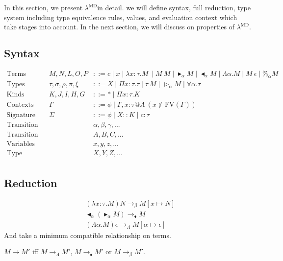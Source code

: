 \documentclass[runningheads]{llncs}
\newcommand{\LMD}{$\lambda^{\textrm{MD}}$}
\newcommand{\G}{\Gamma}
\newcommand{\TW}{\triangleright}
\newcommand{\F}{\forall}
\newcommand{\TB}{\blacktriangleright}
\newcommand{\TBL}{\blacktriangleleft}
\begin{document}
In this section, we present \LMD in detail. we will define syntax, full reduction, type system including type equivalence rules, values, and evaluation context which take stages into account.
In the next section, we will discuss on properties of \LMD.

\subsection{Syntax}

\begin{align*}
    \textrm{Terms} && M,N,L,O,P & ::= c \mid x \mid \lambda x:\tau.M\ \mid M\ M \mid \TB_\alpha M 
    \mid \TBL_\alpha M \mid \Lambda\alpha.M \mid M\ \epsilon \mid \%_\alpha M\\ 
    \textrm{Types} && \tau,\sigma,\rho,\pi,\xi & ::= X \mid \Pi x:\tau.\tau \mid \tau\ M \mid \TW_{\alpha} M \mid \F\alpha.\tau \\
    \textrm{Kinds} && K,J,I,H,G & ::= * \mid \Pi x:\tau.K\\
    \textrm{Contexts} && \Gamma & ::= \phi \mid  \Gamma,x:\tau@A\ (x\not\in\textrm{FV}(\G)) \\
    \textrm{Signature} && \Sigma & ::= \phi \mid X::K \mid c:\tau \\
    \textrm{Transition variables} && & \alpha,\beta,\gamma,... \\
    \textrm{Transition} && & A,B,C,... \\
    \textrm{Variables} && & x,y,z,... \\
    \textrm{Type variables} && & X,Y,Z,... \\
\end{align*}



\subsection{Reduction}

\begin{definition}[Reduction]
\begin{align*}
    & (\lambda x:\tau.M) N \longrightarrow_\beta M[x \mapsto N] \\
    & \TBL_\alpha (\TB_\alpha M)\longrightarrow_\blacklozenge M \\
    & (\Lambda \alpha.M) \epsilon \longrightarrow_\Lambda M[\alpha \mapsto \epsilon]
\end{align*}
And take a minimum compatible relationship on terms.

    $ M \longrightarrow M'$ iff 
    $ M \longrightarrow_\Lambda M' $, $ M \longrightarrow_\blacklozenge M' $ or $ M \longrightarrow_\beta M' $.
\end{definition}
\end{document}

